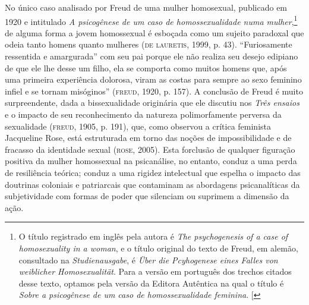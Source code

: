 No único caso analisado por Freud de uma mulher homosexual, publicado em
1920 e intitulado \emph{A psicogênese de um caso de homossexualidade
numa mulher},\footnote{O título registrado em inglês pela autora é
  \emph{The psychogenesis of a case of homosexuality in a woman}, e o
  título original do texto de Freud, em alemão, consultado na
  \emph{Studienausgabe}, é \emph{Über die Pcyhogenese eines Falles von
  weiblicher Homosexualität}. Para a versão em português dos trechos
  citados desse texto, optamos pela versão da Editora Autêntica na qual
  o título é \emph{Sobre a psicogênese de um caso de homossexualidade
  feminina}. {[}\versal{N.~T.}{]}} de alguma forma a jovem homossexual é esboçada
como um sujeito paradoxal que odeia tanto homens quanto mulheres (\textsc{de
lauretis}, 1999, p. 43). ``Furiosamente ressentida e amargurada'' com seu pai
porque ele não realiza seu desejo edipiano de que ele lhe desse um
filho, ela se comporta como muitos homens que, após uma primeira
experiência dolorosa, viram as costas para sempre ao sexo feminino
infiel e se tornam misóginos'' (\textsc{freud}, 1920, p. 157). A conclusão de Freud é
muito surpreendente, dada a bissexualidade originária que ele discutiu
nos \emph{Três ensaios} e o impacto de seu reconhecimento da natureza
polimorfamente perversa da sexualidade (\textsc{freud}, 1905, p. 191), que, como
observou a crítica feminista Jacqueline Rose, está estruturada em torno
das noções de impossibilidade e de fracasso da identidade sexual (\textsc{rose},
2005). Esta forclusão de qualquer figuração positiva da mulher
homossexual na psicanálise, no entanto, conduz a uma perda de
resiliência teórica; conduz a uma rigidez intelectual que espelha o
impacto das doutrinas coloniais e patriarcais que contaminam as
abordagens psicanalíticas da subjetividade com formas de poder que
silenciam ou suprimem a dimensão da ação.

